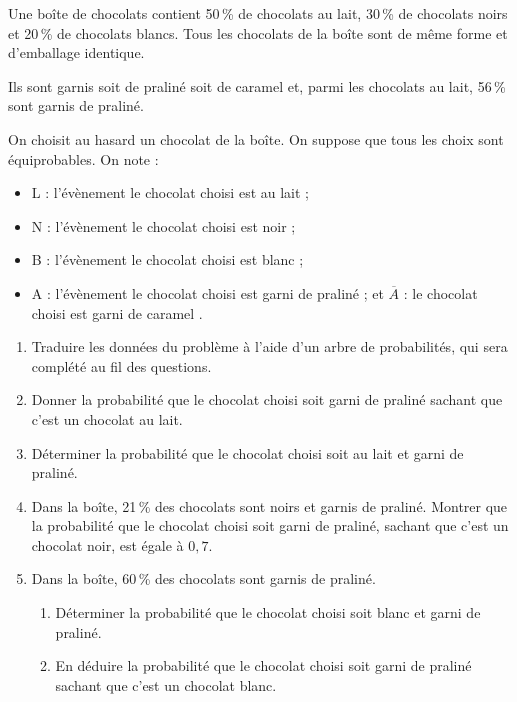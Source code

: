 \documentclass[a4paper,11pt]{article}
\begin{document}
\bigskip


\medskip

Une boîte de chocolats contient 50\,\% de chocolats au lait, 30\,\% de chocolats noirs et 20\,\% de chocolats blancs. Tous les chocolats de la boîte sont de même forme et d'emballage identique. 

Ils sont garnis soit de praliné soit de caramel et, parmi les chocolats au lait, 56\,\% sont garnis de praliné.
 
On choisit au hasard un chocolat de la boîte. On suppose que tous les choix sont équiprobables. On note :
\begin{itemize}[topsep=1pt]
	\item L : l'évènement \og le chocolat choisi est au lait \fg{} ; 
	\item N : l'évènement \og le chocolat choisi est noir \fg{} ; 
	\item B : l'évènement \og le chocolat choisi est blanc \fg{} ; 
	\item A : l'évènement \og le chocolat choisi est garni de praliné \fg{} ; et $\overline{A}$ :  \og le chocolat choisi est garni de caramel \fg. 
\end{itemize}
%
\begin{enumerate}
	\item Traduire les données du problème à l'aide d'un arbre de probabilités, qui sera complété au fil des questions. 
	\item Donner la probabilité que le chocolat choisi soit garni de praliné sachant que c'est un chocolat au lait. 
	\item Déterminer la probabilité  que le chocolat choisi soit au lait et garni de praliné. 
	\item Dans la boîte, 21\,\% des chocolats sont noirs et garnis de praliné. Montrer que la probabilité que le chocolat choisi soit garni de praliné, sachant que c'est un chocolat noir, est égale à $0,7$. 
	\item Dans la boîte, 60\,\% des chocolats sont garnis de praliné. 
	\begin{enumerate}
		\item Déterminer la probabilité que le chocolat choisi soit blanc et garni de praliné. 

		\item En déduire la probabilité que le chocolat choisi soit garni de praliné sachant que c'est un chocolat blanc. 
	\end{enumerate}
%
\end{enumerate}
%
%
%
\end{document}
